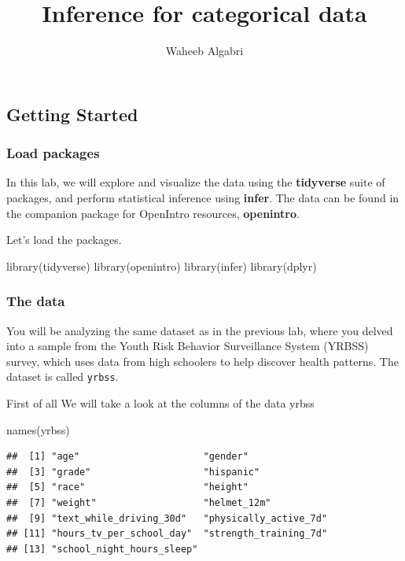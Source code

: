\documentclass[
]{article}
\title{Inference for categorical data}
\author{Waheeb Algabri}
\date{}
\newenvironment{Shaded}{\begin{snugshade}}{\end{snugshade}}
\newcommand{\FunctionTok}[1]{\textcolor[rgb]{0.00,0.00,0.00}{#1}}
\newcommand{\NormalTok}[1]{#1}
\begin{document}
\maketitle

\hypertarget{getting-started}{%
\subsection{Getting Started}\label{getting-started}}

\hypertarget{load-packages}{%
\subsubsection{Load packages}\label{load-packages}}

In this lab, we will explore and visualize the data using the
\textbf{tidyverse} suite of packages, and perform statistical inference
using \textbf{infer}. The data can be found in the companion package for
OpenIntro resources, \textbf{openintro}.

Let's load the packages.

\begin{Shaded}
\begin{Highlighting}[]
\FunctionTok{library}\NormalTok{(tidyverse)}
\FunctionTok{library}\NormalTok{(openintro)}
\FunctionTok{library}\NormalTok{(infer)}
\FunctionTok{library}\NormalTok{(dplyr)}
\end{Highlighting}
\end{Shaded}

\hypertarget{the-data}{%
\subsubsection{The data}\label{the-data}}

You will be analyzing the same dataset as in the previous lab, where you
delved into a sample from the Youth Risk Behavior Surveillance System
(YRBSS) survey, which uses data from high schoolers to help discover
health patterns. The dataset is called \texttt{yrbss}.

First of all We will take a look at the columns of the data yrbss

\begin{Shaded}
\begin{Highlighting}[]
\FunctionTok{names}\NormalTok{(yrbss)}
\end{Highlighting}
\end{Shaded}

\begin{verbatim}
##  [1] "age"                      "gender"                  
##  [3] "grade"                    "hispanic"                
##  [5] "race"                     "height"                  
##  [7] "weight"                   "helmet_12m"              
##  [9] "text_while_driving_30d"   "physically_active_7d"    
## [11] "hours_tv_per_school_day"  "strength_training_7d"    
## [13] "school_night_hours_sleep"
\end{verbatim}
\end{document}
